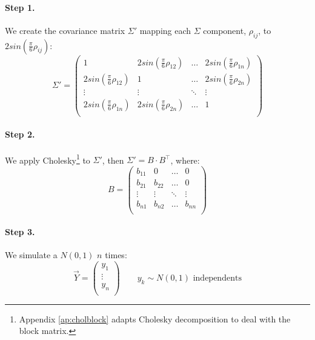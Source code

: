 \documentclass[a4paper,12pt,final]{article}
\begin{document}
\paragraph{Step 1.} We create the covariance matrix $\Sigma'$ mapping each 
$\Sigma$ component, $\rho_{ij}$, to $2 sin(\frac{\pi}{6} \rho_{ij})$:
\begin{displaymath}
\Sigma' = \left( 
\begin{array}{cccc}
1                              & 2 sin(\frac{\pi}{6} \rho_{12}) & \ldots & 2 sin(\frac{\pi}{6} \rho_{1n}) \\
2 sin(\frac{\pi}{6} \rho_{12}) & 1                              & \ldots & 2 sin(\frac{\pi}{6} \rho_{2n}) \\
\vdots                         & \vdots                         & \ddots & \vdots                         \\
2 sin(\frac{\pi}{6} \rho_{1n}) & 2 sin(\frac{\pi}{6} \rho_{2n}) & \ldots & 1                              \\
\end{array}
\right)
\end{displaymath}

\paragraph{Step 2.} We apply Cholesky\footnote{Appendix \ref{ap:cholblock} adapts Cholesky 
decomposition to deal with the block matrix.} to $\Sigma'$, then $\Sigma' = B \cdot B^{\top}$, 
where:
\begin{displaymath}
B = 
\left(
\begin{array}{cccc}
b_{11}   & 0        & \ldots & 0       \\
b_{21}   & b_{22}   & \ldots & 0       \\
\vdots  & \vdots  & \ddots & \vdots    \\
b_{n1}   & b_{n2}   & \ldots & b_{nn}  \\
\end{array}
\right)
\end{displaymath}

\paragraph{Step 3.} We simulate a $N(0,1)$ $n$ times:
\begin{displaymath}
\vec{Y} =
\left(
\begin{array}{c}
y_1    \\
\vdots \\
y_n    \\
\end{array}
\right) 
\qquad y_k \sim N(0,1) \textrm{ independents}
\end{displaymath}
\end{document}
